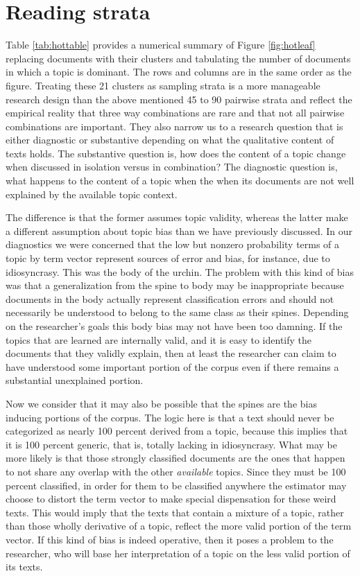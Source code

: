 \documentclass[]{book}
\theoremstyle{definition}
\theoremstyle{definition}
\theoremstyle{definition}
\theoremstyle{remark}
\begin{document}
\hypertarget{reading-strata}{%
\section{Reading strata}\label{reading-strata}}

Table \ref{tab:hottable} provides a numerical summary of Figure
\ref{fig:hotleaf} replacing documents with their clusters and tabulating
the number of documents in which a topic is dominant. The rows and
columns are in the same order as the figure. Treating these 21 clusters
as sampling strata is a more manageable research design than the above
mentioned 45 to 90 pairwise strata and reflect the empirical reality
that three way combinations are rare and that not all pairwise
combinations are important. They also narrow us to a research question
that is either diagnostic or substantive depending on what the
qualitative content of texts holds. The substantive question is, how
does the content of a topic change when discussed in isolation versus in
combination? The diagnostic question is, what happens to the content of
a topic when the when its documents are not well explained by the
available topic context.

The difference is that the former assumes topic validity, whereas the
latter make a different assumption about topic bias than we have
previously discussed. In our diagnostics we were concerned that the low
but nonzero probability terms of a topic by term vector represent
sources of error and bias, for instance, due to idiosyncrasy. This was
the body of the urchin. The problem with this kind of bias was that a
generalization from the spine to body may be inappropriate because
documents in the body actually represent classification errors and
should not necessarily be understood to belong to the same class as
their spines. Depending on the researcher's goals this body bias may not
have been too damning. If the topics that are learned are internally
valid, and it is easy to identify the documents that they validly
explain, then at least the researcher can claim to have understood some
important portion of the corpus even if there remains a substantial
unexplained portion.

Now we consider that it may also be possible that the spines are the
bias inducing portions of the corpus. The logic here is that a text
should never be categorized as nearly 100 percent derived from a topic,
because this implies that it is 100 percent generic, that is, totally
lacking in idiosyncrasy. What may be more likely is that those strongly
classified documents are the ones that happen to not share any overlap
with the other \emph{available} topics. Since they must be 100 percent
classified, in order for them to be classified anywhere the estimator
may choose to distort the term vector to make special dispensation for
these weird texts. This would imply that the texts that contain a
mixture of a topic, rather than those wholly derivative of a topic,
reflect the more valid portion of the term vector. If this kind of bias
is indeed operative, then it poses a problem to the researcher, who will
base her interpretation of a topic on the less valid portion of its
texts.
\end{document}
